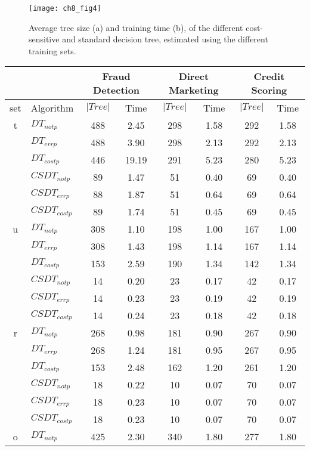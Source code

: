 \begin{figure}
  \centering
  \texttt{[image: ch8\_fig4]}
  \caption{Average tree size (a) and training time (b), of the different cost-sensitive and 
  standard decision tree, estimated using the different training sets.}
  \label{fig:8:4}
\end{figure}

\begin{table}
  \centering
  \footnotesize
  \begin{tabular}{|c|l|c c|c c|c c|}
    \cline{3-8}
    \multicolumn{2}{c}{}& \multicolumn{2}{|c|}{Fraud Detection} & \multicolumn{2}{|c|}{Direct 
    Marketing} 
    & \multicolumn{2}{|c|}{Credit Scoring}\\
    \hline
    set&Algorithm & $\vert Tree\vert$ & Time& $\vert Tree\vert$ & Time& $\vert Tree\vert$ & Time\\
    \hline
    t &$DT_{not p}$&488&2.45&298&1.58&292&1.58\\
    &$DT_{err p}$&488&3.90&298&2.13&292&2.13\\
    &$DT_{cost p}$&446&19.19&291&5.23&280&5.23\\
    &$CSDT_{not p}$&89&1.47&51&0.40&69&0.40\\
    &$CSDT_{err p}$&88&1.87&51&0.64&69&0.64\\
    &$CSDT_{cost p}$&89&1.74&51&0.45&69&0.45\\
    \hline
    u &$DT_{not p}$&308&1.10&198&1.00&167&1.00\\
    &$DT_{err p}$&308&1.43&198&1.14&167&1.14\\
    &$DT_{cost p}$&153&2.59&190&1.34&142&1.34\\
    &$CSDT_{not p}$&14&0.20&23&0.17&42&0.17\\
    &$CSDT_{err p}$&14&0.23&23&0.19&42&0.19\\
    &$CSDT_{cost p}$&14&0.24&23&0.18&42&0.18\\
    \hline
    r &$DT_{not p}$&268&0.98&181&0.90&267&0.90\\
    &$DT_{err p}$&268&1.24&181&0.95&267&0.95\\
    &$DT_{cost p}$&153&2.48&162&1.20&261&1.20\\
    &$CSDT_{not p}$&18&0.22&10&0.07&70&0.07\\
    &$CSDT_{err p}$&18&0.23&10&0.07&70&0.07\\
    &$CSDT_{cost p}$&18&0.23&10&0.07&70&0.07\\
    \hline
    o &$DT_{not p}$&425&2.30&340&1.80&277&1.80\\

\end{tabular}
\end{table}

